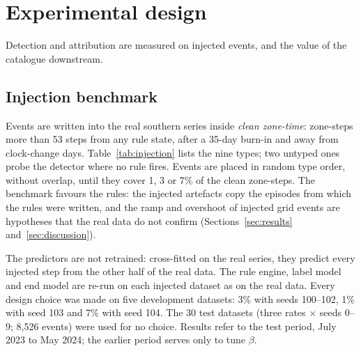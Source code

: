\section{Experimental design}\label{sec:experiments}

Detection and attribution are measured on injected events, and the value of the catalogue downstream.

\subsection{Injection benchmark}\label{sec:injection}

Events are written into the real southern series inside \emph{clean zone-time}: zone-steps more than 53 steps from any rule state, after a 35-day burn-in and away from clock-change days. Table~\ref{tab:injection} lists the nine types; two untyped ones probe the detector where no rule fires. Events are placed in random type order, without overlap, until they cover 1, 3 or 7\% of the clean zone-steps. The benchmark favours the rules: the injected artefacts copy the episodes from which the rules were written, and the ramp and overshoot of injected grid events are hypotheses that the real data do not confirm (Sections~\ref{sec:results} and~\ref{sec:discussion}).

The predictors are not retrained: cross-fitted on the real series, they predict every injected step from the other half of the real data. The rule engine, label model and end model are re-run on each injected dataset as on the real data. Every design choice was made on five development datasets: 3\% with seeds 100--102, 1\% with seed 103 and 7\% with seed 104. The 30 test datasets (three rates $\times$ seeds 0--9; 8,526 events) were used for no choice. Results refer to the test period, July 2023 to May 2024; the earlier period serves only to tune $\beta$.

